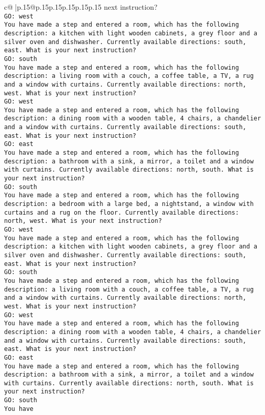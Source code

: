 \documentclass{article}
\begin{document}
{\begin{supertabular}{c@{$\;$}|p{.15\linewidth}@{}p{.15\linewidth}p{.15\linewidth}p{.15\linewidth}p{.15\linewidth}p{.15\linewidth}}
{{{next instruction?\\ \tt GO: west\\ \tt You have made a step and entered a room, which has the following description: a kitchen with light wooden cabinets, a grey floor and a silver oven and dishwasher. Currently available directions: south, east. What is your next instruction?\\ \tt GO: south\\ \tt You have made a step and entered a room, which has the following description: a living room with a couch, a coffee table, a TV, a rug and a window with curtains. Currently available directions: north, west. What is your next instruction?\\ \tt GO: west\\ \tt You have made a step and entered a room, which has the following description: a dining room with a wooden table, 4 chairs, a chandelier and a window with curtains. Currently available directions: south, east. What is your next instruction?\\ \tt GO: east\\ \tt You have made a step and entered a room, which has the following description: a bathroom with a sink, a mirror, a toilet and a window with curtains. Currently available directions: north, south. What is your next instruction?\\ \tt GO: south\\ \tt You have made a step and entered a room, which has the following description: a bedroom with a large bed, a nightstand, a window with curtains and a rug on the floor. Currently available directions: north, west. What is your next instruction?\\ \tt GO: west\\ \tt You have made a step and entered a room, which has the following description: a kitchen with light wooden cabinets, a grey floor and a silver oven and dishwasher. Currently available directions: south, east. What is your next instruction?\\ \tt GO: south\\ \tt You have made a step and entered a room, which has the following description: a living room with a couch, a coffee table, a TV, a rug and a window with curtains. Currently available directions: north, west. What is your next instruction?\\ \tt GO: west\\ \tt You have made a step and entered a room, which has the following description: a dining room with a wooden table, 4 chairs, a chandelier and a window with curtains. Currently available directions: south, east. What is your next instruction?\\ \tt GO: east\\ \tt You have made a step and entered a room, which has the following description: a bathroom with a sink, a mirror, a toilet and a window with curtains. Currently available directions: north, south. What is your next instruction?\\ \tt GO: south\\ \tt You have }}}
\end{supertabular}}
\end{document}
